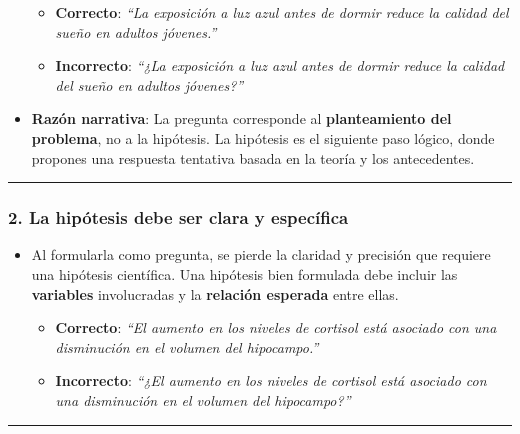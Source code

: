 \documentclass[
  10pt]{article}
\providecommand{\tightlist}{%
  \setlength{\itemsep}{0pt}\setlength{\parskip}{0pt}}\usepackage{longtable,booktabs,array}
\begin{document}
\begin{tcolorbox}
\begin{itemize}
  \begin{itemize}
  \tightlist
  \item
    \textbf{Correcto}: \emph{``La exposición a luz azul antes de dormir
    reduce la calidad del sueño en adultos jóvenes.''}\\
  \item
    \textbf{Incorrecto}: \emph{``¿La exposición a luz azul antes de
    dormir reduce la calidad del sueño en adultos jóvenes?''}
  \end{itemize}
\item
  \textbf{Razón narrativa}: La pregunta corresponde al
  \textbf{planteamiento del problema}, no a la hipótesis. La hipótesis
  es el siguiente paso lógico, donde propones una respuesta tentativa
  basada en la teoría y los antecedentes.
\end{itemize}

\begin{center}\rule{0.5\linewidth}{0.5pt}\end{center}

\subsubsection{\texorpdfstring{\textbf{2. La hipótesis debe ser clara y
específica}}{2. La hipótesis debe ser clara y específica}}\label{la-hipuxf3tesis-debe-ser-clara-y-especuxedfica}

\begin{itemize}
\tightlist
\item
  Al formularla como pregunta, se pierde la claridad y precisión que
  requiere una hipótesis científica. Una hipótesis bien formulada debe
  incluir las \textbf{variables} involucradas y la \textbf{relación
  esperada} entre ellas.

  \begin{itemize}
  \tightlist
  \item
    \textbf{Correcto}: \emph{``El aumento en los niveles de cortisol
    está asociado con una disminución en el volumen del hipocampo.''}\\
  \item
    \textbf{Incorrecto}: \emph{``¿El aumento en los niveles de cortisol
    está asociado con una disminución en el volumen del hipocampo?''}
  \end{itemize}
\end{itemize}

\begin{center}\rule{0.5\linewidth}{0.5pt}\end{center}


\end{tcolorbox}
\end{document}
